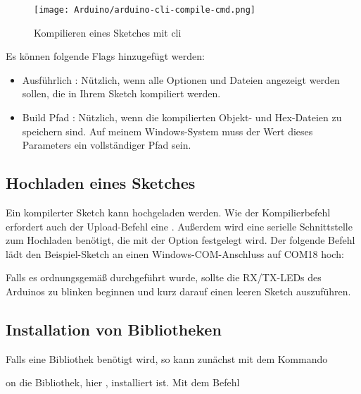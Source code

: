 \begin{figure}
    \centering
    \texttt{[image: Arduino/arduino-cli-compile-cmd.png]}
    \caption{Kompilieren eines Sketches mit \ac{cli}}
    \label{ArduinoCompile}
\end{figure}


Es können folgende Flags hinzugefügt werden:

\begin{itemize}
    \item Ausführlich :  Nützlich, wenn alle Optionen und Dateien angezeigt werden sollen, die in Ihrem Sketch kompiliert werden.
    \item Build Pfad : Nützlich, wenn die kompilierten Objekt- und Hex-Dateien zu speichern sind. Auf meinem Windows-System muss der Wert dieses Parameters ein vollständiger Pfad sein.	
\end{itemize}

\subsection{Hochladen eines Sketches}

Ein kompilerter Sketch kann hochgeladen werden. Wie der Kompilierbefehl erfordert auch der Upload-Befehl eine . Außerdem wird eine serielle Schnittstelle zum Hochladen benötigt, die mit der Option  festgelegt wird.
Der folgende Befehl lädt den Beispiel-Sketch an einen Windows-COM-Anschluss auf COM18 hoch:

\medskip


\medskip


Falls es ordnungsgemäß durchgeführt wurde, sollte die RX/TX-LEDs des Arduinos zu blinken beginnen und kurz darauf einen leeren Sketch auszuführen.


\subsection{Installation von Bibliotheken}

Falls eine Bibliothek benötigt wird, so kann zunächst mit dem Kommando 

\medskip


\medskip

on die Bibliothek, hier , installiert ist. Mit dem Befehl

